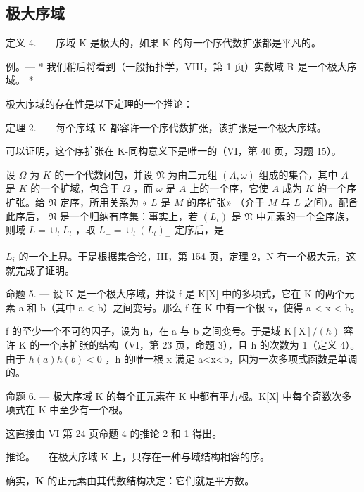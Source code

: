 \subsection{极大序域}

定义 4.——序域 K 是极大的，如果 K 的每一个序代数扩张都是平凡的。

例。--- * 我们稍后将看到（一般拓扑学，VIII，第 1 页）实数域 R 是一个极大序域。 *

极大序域的存在性是以下定理的一个推论：

定理 2.——每个序域 K 都容许一个序代数扩张，该扩张是一个极大序域。

可以证明，这个序扩张在 K-同构意义下是唯一的（VI，第 40 页，习题 15）。

设 \(\Omega\) 为 \(K\) 的一个代数闭包，并设 \(\mathfrak{N}\) 为由二元组 \((A, \omega)\) 组成的集合，其中 \(A\) 是 \(K\) 的一个扩域，包含于 \(\Omega\) ，而 \(\omega\) 是 \(A\) 上的一个序，它使 \(A\) 成为 \(K\) 的一个序扩张。给 \(\mathfrak{N}\) 定序，所用关系为 « \(L\) 是 \(M\) 的序扩张» （介于 \(M\) 与 \(L\) 之间）。配备此序后， \(\mathfrak{N}\) 是一个归纳有序集：事实上，若 \((L_{t})\) 是 \(\mathfrak{N}\) 中元素的一个全序族，则域 \(L = \cup_{t} L_{t}\) ，取 \(L_{+} = \cup_{t} (L_{t})_{+}\) 定序后，是

\(L_{i}\) 的一个上界。于是根据集合论，III，第 154 页，定理 2，N 有一个极大元，这就完成了证明。

命题 5. --- 设 K 是一个极大序域，并设 f 是 K{[}X{]} 中的多项式，它在 K 的两个元素 a 和 b（其中 a \textless{} b）之间变号。那么 f 在 K 中有一个根 x，使得 a \textless{} x \textless{} b。

f 的至少一个不可约因子，设为 h，在 a 与 b 之间变号。于是域 \(\mathrm{K}[\mathrm{X}]/(h)\) 容许 K 的一个序扩张的结构（VI，第 23 页，命题 3），且 h 的次数为 1（定义 4）。由于 \(h(a)h(b)<0\) ，h 的唯一根 x 满足 a\textless x\textless b，因为一次多项式函数是单调的。

命题 6. --- 极大序域 K 的每个正元素在 K 中都有平方根。K{[}X{]} 中每个奇数次多项式在 K 中至少有一个根。

这直接由 VI 第 24 页命题 4 的推论 2 和 1 得出。

推论。--- 在极大序域 K 上，只存在一种与域结构相容的序。

确实，\(\mathbf{K}\) 的正元素由其代数结构决定：它们就是平方数。

